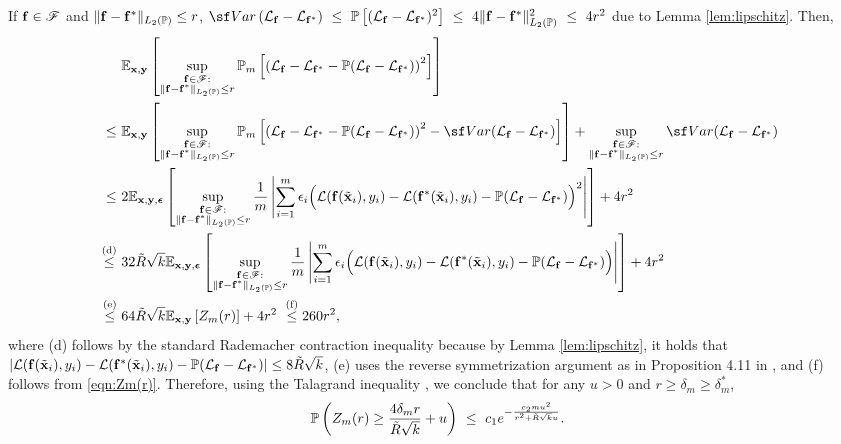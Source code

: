 {    
    If $\mathbf{f} \in \mathscr{F}$
    and $\lVert \mathbf{f} - \mathbf{f}^*\rVert_{L_2(\mathbb{P})}\leq r$,
    $
    {\sf Var}\left(\Lcal_{\fvec} - \Lcal_{\fvec^*}\right) ~\leq~ \Prob\left[(\Lcal_{\fvec} - \Lcal_{\fvec^*})^2\right]~\leq~ 4 \lVert \fvec - \fvec^*\rVert^2_{L_2(\Prob)}~\leq~ 4r^2$ due to Lemma \ref{lem:lipschitz}.
    Then, 
    \begin{align*}
        &\E_{\x, \y}\left[\sup_{\substack{\fvec \in \Fscr: \\\lVert \fvec - \fvec^*\rVert_{L_2(\Prob)} \leq r}} \Prob_m\left[\left(\Lcal_{\fvec} - \Lcal_{\fvec^*} - \Prob(\Lcal_{\fvec} - \Lcal_{\fvec^*} ) 
        \right)^2\right]
        \right]\\~\leq~ & \E_{\x, \y}\left[\sup_{\substack{\fvec \in \Fscr: \\\lVert \fvec - \fvec^*\rVert_{L_2(\Prob)} \leq r}}\Prob_m\left[\left(\Lcal_{\fvec} - \Lcal_{\fvec^*} - \Prob(\Lcal_{\fvec} - \Lcal_{\fvec^*} ) 
        \right)^2 - {\sf Var}(\Lcal_{\fvec} - \Lcal_{\fvec^*})\right]
        \right] + \sup_{\substack{\fvec \in \Fscr: \\\lVert \fvec - \fvec^*\rVert_{L_2(\Prob)} \leq r}}{\sf Var}(\Lcal_{\fvec} - \Lcal_{\fvec^*})\\
        ~\leq~ & 2\E_{\x, \y,\epsvec}\left[\sup_{\substack{\fvec \in \Fscr: \\\lVert \fvec - \fvec^*\rVert_{L_2(\Prob)} \leq r}}
        \frac{1}{m}\left|\sum_{i=1}^m \epsilon_i \Big(\Lcal(\fvec(\tilde{\x}_i), y_i) - \Lcal(\fvec^*(\tilde{\x}_i), y_i) - \Prob(\Lcal_{\fvec} - \Lcal_{\fvec^*} ) 
        \Big)^2 \right|
        \right] + 4r^2\\
        ~\stackrel{\text{(d)}}{\leq}~ & 32\tilde{R}\sqrt{k}\E_{\x, \y,\epsvec}\left[\sup_{\substack{\fvec \in \Fscr: \\\lVert \fvec - \fvec^*\rVert_{L_2(\Prob)} \leq r}}
        \frac{1}{m}\left|\sum_{i=1}^m \epsilon_i \Big(\Lcal(\fvec(\tilde{\x}_i), y_i) - \Lcal(\fvec^*(\tilde{\x}_i), y_i) - \Prob(\Lcal_{\fvec} - \Lcal_{\fvec^*} ) 
        \Big) \right|
        \right] + 4r^2\\
        ~\stackrel{\text{(e)}}{\leq}~ & 64\tilde{R}\sqrt{k}\E_{\x,\y}\left[ Z_m(r) \right]+ 4r^2~\stackrel{\text{(f)}}{\leq}
        260r^2,
    \end{align*}
    where (d) follows by the standard Rademacher contraction inequality because by Lemma \ref{lem:lipschitz}, it holds that $|\mathcal{L}(\mathbf{f}(\tilde{\mathbf{x}}_i), y_i) - \mathcal{L}(\mathbf{f}^*(\tilde{\mathbf{x}}_i), y_i) - \mathbb{P}(\mathcal{L}_{\mathbf{f}} - \mathcal{L}_{\mathbf{f}^*} )| \leq 8\tilde{R}\sqrt{k}$,
    (e) uses the reverse symmetrization argument as in Proposition 4.11 in \cite{wainwright1945high},
    and (f) follows from \eqref{eqn:Zm(r)}.
    Therefore, using the Talagrand inequality \citep{wainwright1945high}, we conclude that for any $u > 0$ and $r \geq \delta_m \geq \delta^*_m$, 
    \begin{align}
    \label{eqn:concentration-z}
        \mathbb{P}\left(Z_m(r) \geq \frac{4\delta_m r}{\tilde{R}\sqrt{k}} + u\right) ~\leq~ c_1e^{-\frac{c_2 m u^2}{r^2 + \tilde{R}\sqrt{k}u}}.
    \end{align}

}

